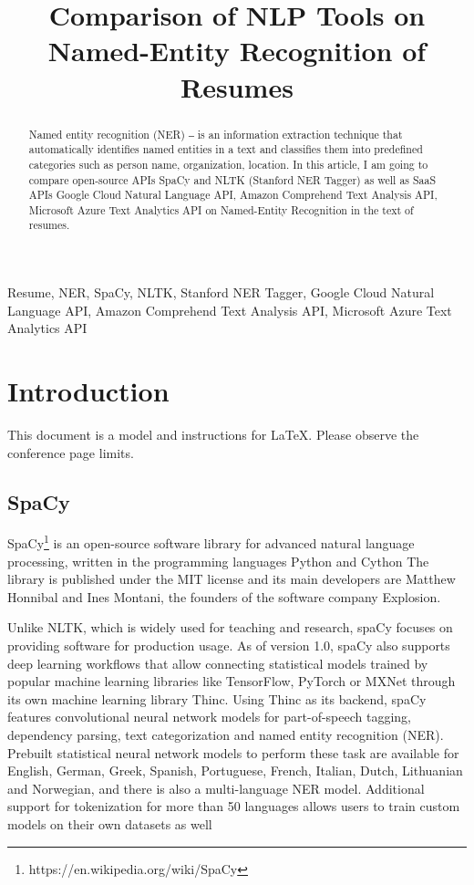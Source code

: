 \documentclass[conference]{IEEEtran}
\begin{document}
\title{Comparison of NLP Tools on Named-Entity Recognition of Resumes}

\author{
}

\maketitle

\begin{abstract}
Named entity recognition (NER) ‒ is an information extraction technique that automatically identifies named entities in a text and classifies them into predefined categories such as person name, organization, location. In this article, I am going to compare open-source APIs SpaCy and NLTK (Stanford NER Tagger) as well as SaaS APIs Google Cloud Natural Language API, Amazon Comprehend Text Analysis API, Microsoft Azure Text Analytics API on Named-Entity Recognition in the text of resumes.\end{abstract}

\begin{IEEEkeywords}
Resume, NER, SpaCy, NLTK, Stanford NER Tagger, Google Cloud Natural Language API, Amazon Comprehend Text Analysis API, Microsoft Azure Text Analytics API 
\end{IEEEkeywords}

\section{Introduction}
This document is a model and instructions for \LaTeX.
Please observe the conference page limits. 

\subsection{SpaCy}

SpaCy\footnote{https://en.wikipedia.org/wiki/SpaCy} is an open-source software library for advanced natural language processing, written in the programming languages Python and Cython The library is published under the MIT license and its main developers are Matthew Honnibal and Ines Montani, the founders of the software company Explosion.

Unlike NLTK, which is widely used for teaching and research, spaCy focuses on providing software for production usage. As of version 1.0, spaCy also supports deep learning workflows that allow connecting statistical models trained by popular machine learning libraries like TensorFlow, PyTorch or MXNet through its own machine learning library Thinc. Using Thinc as its backend, spaCy features convolutional neural network models for part-of-speech tagging, dependency parsing, text categorization and named entity recognition (NER). Prebuilt statistical neural network models to perform these task are available for English, German, Greek, Spanish, Portuguese, French, Italian, Dutch, Lithuanian and Norwegian, and there is also a multi-language NER model. Additional support for tokenization for more than 50 languages allows users to train custom models on their own datasets as well
\end{document}
